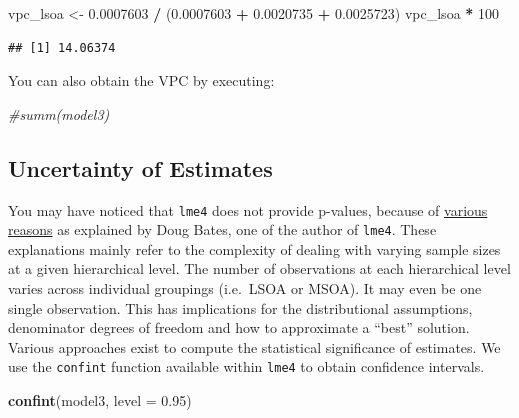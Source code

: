 \documentclass[
]{book}
\newenvironment{Shaded}{\begin{snugshade}}{\end{snugshade}}
\newcommand{\CommentTok}[1]{\textcolor[rgb]{0.56,0.35,0.01}{\textit{#1}}}
\newcommand{\DataTypeTok}[1]{\textcolor[rgb]{0.13,0.29,0.53}{#1}}
\newcommand{\DecValTok}[1]{\textcolor[rgb]{0.00,0.00,0.81}{#1}}
\newcommand{\FloatTok}[1]{\textcolor[rgb]{0.00,0.00,0.81}{#1}}
\newcommand{\KeywordTok}[1]{\textcolor[rgb]{0.13,0.29,0.53}{\textbf{#1}}}
\newcommand{\NormalTok}[1]{#1}
\newcommand{\OperatorTok}[1]{\textcolor[rgb]{0.81,0.36,0.00}{\textbf{#1}}}
\newcommand{\StringTok}[1]{\textcolor[rgb]{0.31,0.60,0.02}{#1}}
\begin{document}
\begin{Shaded}
\begin{Highlighting}[]
\NormalTok{vpc_lsoa <-}\StringTok{ }\FloatTok{0.0007603} \OperatorTok{/}\StringTok{ }\NormalTok{(}\FloatTok{0.0007603} \OperatorTok{+}\StringTok{ }\FloatTok{0.0020735} \OperatorTok{+}\StringTok{ }\FloatTok{0.0025723}\NormalTok{)}
\NormalTok{vpc_lsoa }\OperatorTok{*}\StringTok{ }\DecValTok{100}
\end{Highlighting}
\end{Shaded}

\begin{verbatim}
## [1] 14.06374
\end{verbatim}

You can also obtain the VPC by executing:

\begin{Shaded}
\begin{Highlighting}[]
\CommentTok{#summ(model3)}
\end{Highlighting}
\end{Shaded}

\hypertarget{uncertainty-of-estimates}{%
\subsection{Uncertainty of Estimates}\label{uncertainty-of-estimates}}

You may have noticed that \texttt{lme4} does not provide p-values, because of \href{https://stat.ethz.ch/pipermail/r-help/2006-May/094765.html}{various reasons} as explained by Doug Bates, one of the author of \texttt{lme4}. These explanations mainly refer to the complexity of dealing with varying sample sizes at a given hierarchical level. The number of observations at each hierarchical level varies across individual groupings (i.e.~LSOA or MSOA). It may even be one single observation. This has implications for the distributional assumptions, denominator degrees of freedom and how to approximate a ``best'' solution. Various approaches exist to compute the statistical significance of estimates. We use the \texttt{confint} function available within \texttt{lme4} to obtain confidence intervals.

\begin{Shaded}
\begin{Highlighting}[]
\KeywordTok{confint}\NormalTok{(model3, }\DataTypeTok{level =} \FloatTok{0.95}\NormalTok{)}
\end{Highlighting}
\end{Shaded}
\end{document}
